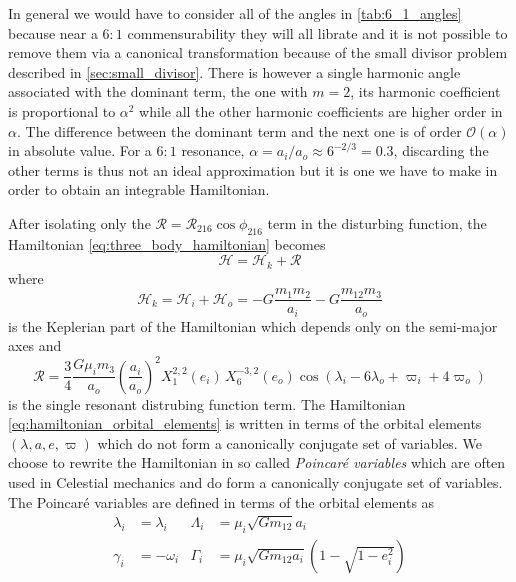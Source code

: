 \documentclass[ twoside,openright,titlepage,numbers=noenddot,headinclude,%
                footinclude=true,cleardoublepage=empty,abstractoff, %
                BCOR=5mm,paper=a4,fontsize=11pt,%
                american,%
                ]{scrreprt}
\begin{document}
In general we would have to consider all of the angles in \cref{tab:6_1_angles}
because near a $6:1$ commensurability they will all librate and it is not possible
to remove them via a canonical transformation because of the small
divisor problem described in \cref{sec:small_divisor}.
There is however a single harmonic angle associated with the dominant term, the one with 
$m=2$, its harmonic coefficient is proportional to $\alpha^2$
while all the other harmonic coefficients
are higher order in $\alpha$. The difference between the dominant term and the 
next one is of order $\mathcal{O}(\alpha)$ in absolute value. For a $6:1$ resonance, 
$\alpha=a_i/a_o\approx 6^{-2/3}=0.3$, discarding the other terms is thus
not an ideal approximation but it is one we have to make in order to obtain 
an integrable Hamiltonian. 

After isolating only the $\mathcal{R}=\mathcal{R}_{216}
\cos\phi_{216}$ term in the disturbing function, the Hamiltonian
\ref{eq:three_body_hamiltonian} becomes
\begin{equation}
    \mathcal{H}=\mathcal{H}_k+\mathcal{R}
    \label{eq:hamiltonian_orbital_elements}
\end{equation}
where
\begin{equation}
    \mathcal{H}_k=\mathcal{H}_i+\mathcal{H}_o=
    -G \frac{m_1m_2}{a_i} -G \frac{m_{12}m_3}{a_o}
\end{equation}
is the Keplerian part of the Hamiltonian which depends only on the 
semi-major axes and
\begin{equation}
    \mathcal{R}=\frac{3}{4}\frac{G\mu_im_3}{a_o}\left(\frac{a_i}{a_o}\right)^2
    X^{2,2}_1(e_i)\,X^{-3,2}_6(e_o)\cos(\lambda_i-6\lambda_o+
    \varpi_i + 4\varpi_o)
\end{equation}
is the single resonant distrubing function term. The Hamiltonian 
\ref{eq:hamiltonian_orbital_elements} is written in terms of the
orbital elements $(\lambda,a,e,\varpi)$ which do not form a canonically
conjugate set of variables. We choose to rewrite the Hamiltonian in
so called \emph{Poincaré variables} which are often used in Celestial 
mechanics and do form a canonically conjugate set of variables. The Poincaré
variables are defined in terms of the orbital elements as
\begin{equation}
    \begin{aligned}
        \lambda_i&=\lambda_i &\Lambda_i&=\mu_i\sqrt{Gm_{12}}a_i\\
        \gamma_i&=-\omega_i & \Gamma_i&=\mu_i\sqrt{Gm_{12}a_i}
    \left(1-\sqrt{1-e_i^2}\right)
\end{aligned}
\label{eq:poincare_variables}
\end{equation}
\end{document}
